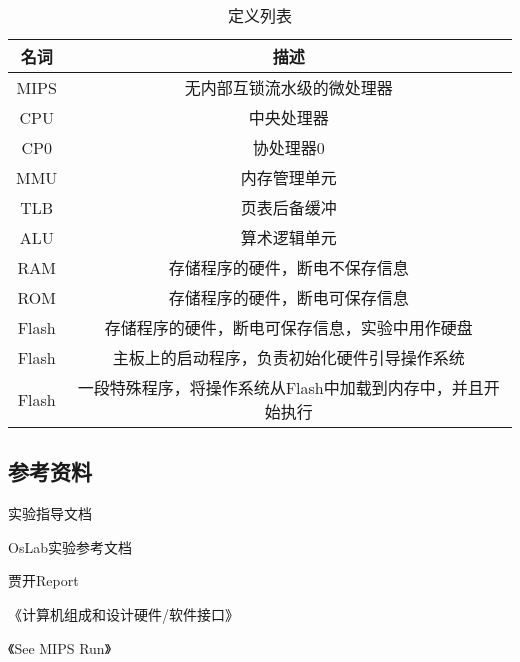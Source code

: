         \begin{table}[!hbp]
        \centering
        \caption{定义列表}
        \begin{tabular}{|c|c|}
        \hline
        名词 & 描述　\\
        \hline
        MIPS & 无内部互锁流水级的微处理器 \\
        \hline
        CPU &  中央处理器\\
        \hline
        CP0 & 协处理器0 \\
        \hline
        MMU & 内存管理单元 \\
        \hline
        TLB & 页表后备缓冲 \\
        \hline
        ALU & 算术逻辑单元 \\
        \hline
        RAM & 存储程序的硬件，断电不保存信息 \\
        \hline
        ROM & 存储程序的硬件，断电可保存信息 \\
        \hline
        Flash & 存储程序的硬件，断电可保存信息，实验中用作硬盘 \\
        \hline
        Flash & 主板上的启动程序，负责初始化硬件引导操作系统 \\
        \hline
        Flash & 一段特殊程序，将操作系统从Flash中加载到内存中，并且开始执行 \\
        \hline
        \end{tabular}
        \end{table}

    \subsection{参考资料}
        实验指导文档

        OsLab实验参考文档

        贾开Report

        《计算机组成和设计硬件/软件接口》

        《See MIPS Run》


